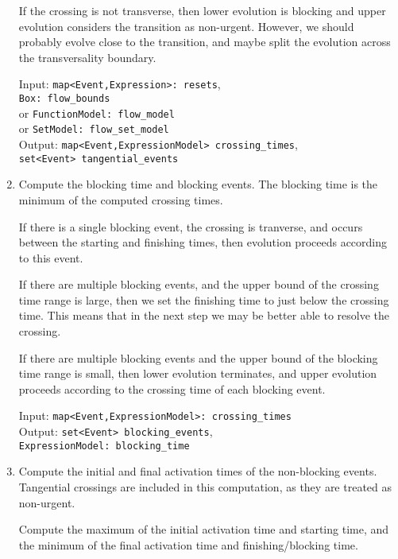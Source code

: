 \documentclass[english,a4paper]{article}
\theoremstyle{theorem}
\theoremstyle{definition}
\theoremstyle{remark}
\begin{document}
\begin{enumerate}
If the crossing is not transverse, then lower evolution is blocking
and upper evolution considers the transition as non-urgent. However,
we should probably evolve close to the transition, and maybe split
the evolution across the transversality boundary.

\begin{tabbing}
Input: \= \texttt{map<Event,Expression>:\ resets}, \\
       \> \texttt{Box:\ flow\_bounds} \\
       \> \quad or \texttt{FunctionModel:\ flow\_model} \\
       \> \quad or \texttt{SetModel:\ flow\_set\_model} \\
Output: \= \texttt{map<Event,ExpressionModel>\ crossing\_times}, \\
        \> \texttt{set<Event>\ tangential\_events}
\end{tabbing}

\item Compute the blocking time and blocking events. The blocking time is
the minimum of the computed crossing times.

If there is a single  blocking event, the crossing is tranverse, and
occurs between the starting and finishing times, then evolution
proceeds according to this event.

If there are multiple blocking events, and the upper bound of the
crossing time range is large, then we set the finishing time to
just below the crossing time. This means that in the next step
we may be better able to resolve the crossing.

If there are multiple blocking events and the upper bound of the
blocking time range is small, then lower evolution terminates, and
upper evolution proceeds according to the crossing time of each
blocking event.

\begin{tabbing}
Input: \= \texttt{map<Event,ExpressionModel>:\ crossing\_times} \\
Output: \= \texttt{set<Event>\ blocking\_events}, \\
        \> \texttt{ExpressionModel:\ blocking\_time}
\end{tabbing}

\item Compute the initial and final activation times of the non-blocking
events. Tangential crossings are included in this computation,
as they are treated as non-urgent.

Compute the maximum of the initial activation time and starting time,
and the minimum of the final activation time and finishing/blocking
time.


\end{enumerate}
\end{document}
